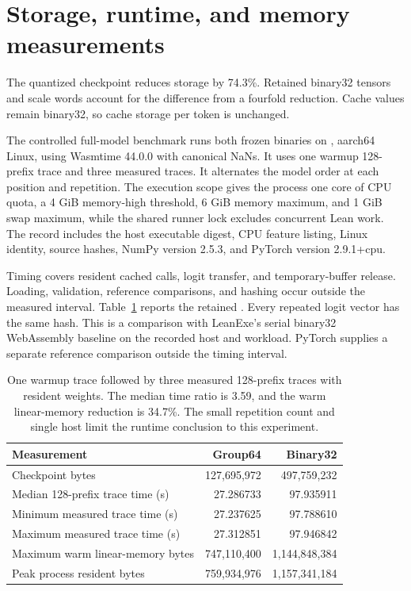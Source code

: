 \section{Storage, runtime, and memory measurements}
\label{sec:runtime}

The quantized checkpoint reduces storage by 74.3\%.  Retained binary32 tensors and scale words account for the difference from a fourfold reduction.  Cache values remain binary32, so cache storage per token is unchanged.

The controlled full-model benchmark runs both frozen binaries on , aarch64 Linux, using Wasmtime 44.0.0 with canonical NaNs.  It uses one warmup 128-prefix trace and three measured traces.  It alternates the model order at each position and repetition.  The execution scope gives the process one core of CPU quota, a 4 GiB memory-high threshold, 6 GiB memory maximum, and 1 GiB swap maximum, while the shared runner lock excludes concurrent Lean work.  The record includes the host executable digest, CPU feature listing, Linux identity, source hashes, NumPy version 2.5.3, and PyTorch version 2.9.1+cpu.

Timing covers resident cached calls, logit transfer, and temporary-buffer release.  Loading, validation, reference comparisons, and hashing occur outside the measured interval.  Table~\ref{tab:runtime} reports the retained .  Every repeated logit vector has the same hash.  This is a comparison with LeanExe's serial binary32 WebAssembly baseline on the recorded host and workload.  PyTorch supplies a separate reference comparison outside the timing interval.

\begin{table}[ht]
\centering
\small
\begin{tabular}{lrr}
\toprule
Measurement & Group64 & Binary32\\
\midrule
Checkpoint bytes & 127,695,972 & 497,759,232\\
Median 128-prefix trace time (s) & 27.286733 & 97.935911\\
Minimum measured trace time (s) & 27.237625 & 97.788610\\
Maximum measured trace time (s) & 27.312851 & 97.946842\\
Maximum warm linear-memory bytes & 747,110,400 & 1,144,848,384\\
Peak process resident bytes & 759,934,976 & 1,157,341,184\\
\bottomrule
\end{tabular}
\caption{One warmup trace followed by three measured 128-prefix traces with resident weights.  The median time ratio is 3.59, and the warm linear-memory reduction is 34.7\%.  The small repetition count and single host limit the runtime conclusion to this experiment.}
\label{tab:runtime}
\end{table}

